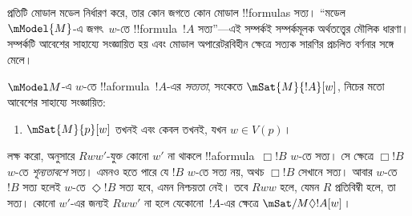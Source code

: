 \documentclass[../../../include/open-logic-section]{subfiles}
\begin{document}


প্রতিটি মোডাল মডেল নির্ধারণ করে, তার কোন জগতে কোন মোডাল !!{formula}s সত্য।
``মডেল $\mModel{M}$-এ জগৎ~$w$-তে !!{formula}~$!A$ সত্য''—এই সম্পর্কই
সম্পর্কমূলক অর্থতত্ত্বের মৌলিক ধারণা। সম্পর্কটি আবেশের সাহায্যে সংজ্ঞায়িত
হয় এবং মোডাল অপারেটরবিহীন ক্ষেত্রে সত্যক সারণির প্রচলিত বর্ণনার সঙ্গে মেলে।

\begin{defn}
  $\mModel M$-এ $w$-তে !!a{formula}~$!A$-এর \emph{সত্যতা}, সংকেতে
  $\mSat{M}{!A}[w]$, নিচের মতো আবেশের সাহায্যে সংজ্ঞায়িত:
  \begin{enumerate}
  \item $\mSat{M}{p}[w]$ তখনই এবং কেবল তখনই, যখন $w \in V(p)$।
  \end{enumerate}
\end{defn}

লক্ষ করো,  অনুসারে $Rww'$-যুক্ত কোনো $w'$
না থাকলে !!a{formula}~$\Box !B$ $w$-তে সত্য। সে ক্ষেত্রে $\Box !B$
$w$-তে \emph{শূন্যতাবশে} সত্য। এমনও হতে পারে যে $!B$ $w$-তে সত্য নয়,
অথচ $\Box !B$ সেখানে সত্য। আবার $w$-তে $!B$ সত্য হলেই $w$-তে
$\Diamond !B$ সত্য হবে, এমন নিশ্চয়তা নেই। তবে $Rww$ হলে, যেমন $R$
প্রতিবিম্বী হলে, তা সত্য। কোনো $w'$-এর জন্যই $Rww'$ না হলে যেকোনো~$!A$-এর
ক্ষেত্রে $\mSat/{M}{\Diamond !A}[w]$।
\end{document}
